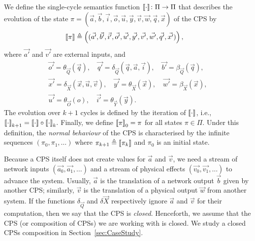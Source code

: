 {\begin{definition}
We define the single-cycle semantics function ${{{\llbracket\cdot\rrbracket}}}\colon \Pi \rightarrow \Pi$ that describes the evolution of the state $\pi=(\vec{a},\vec{b},\vec{i},\vec{o},\vec{u},\vec{y},\vec{v},\vec{w},\vec{q},\vec{x})$ of the CPS by
\begin{align}
{{\llbracket\pi\rrbracket}}&\triangleq\left((\vec{a'},\vec{b'},\vec{i'},\vec{o'},\vec{u'},\vec{y'},\vec{v'},\vec{w'},\vec{q'},\vec{x'})\right), 
\end{align}
where $\vec{a'}$ and $\vec{v'}$ are external inputs, and 
\begin{gather*}
\vec{o'}=\theta_{\vec{Q}}(\vec{q}),\quad 
\vec{q'}=\delta_{\vec{Q}}(\vec{q},\vec{a},\vec{i}),\quad 
\vec{b'}=\beta_{\vec{Q}}(\vec{q}),\\
\vec{x'}=\delta_{\vec{X}}(\vec{x},\vec{u},\vec{v}),\quad
\vec{y'}=\theta_{\vec{X}}(\vec{x}),\quad 
\vec{w'}=\beta_{\vec{X}}(\vec{x}),\\
\vec{u'}= \theta_{\vec{O}}(o),\quad\vec{i'}=\theta_{\vec{Y}}(\vec{y}).
\end{gather*}
The evolution over $k+1$ cycles is defined by the iteration of ${{{\llbracket\cdot\rrbracket}}}$, {i.e.}, 
${{{\llbracket\cdot\rrbracket}}}_{k+1}= {{{\llbracket\cdot\rrbracket}}} \circ {{{\llbracket\cdot\rrbracket}}}_{k}.$
Finally, we define ${{\llbracket\pi\rrbracket}}_{0}=\pi$ for all states $\pi \in \Pi$. Under this definition, the \emph{normal behaviour} of the CPS is characterised by the infinite sequences $(\pi_0, \pi_1, \ldots)$ where $\pi_{k+1}\triangleq{{\llbracket\pi_k\rrbracket}}$ and $\pi_0$ is an initial state.%
\end{definition}
}
Because a CPS itself does not create values for $\vec{a}$ and $\vec{v}$, we need a stream of network inputs $(\vec{a_0}, \vec{a_1}, \ldots)$ and a stream of physical effects $(\vec{v_0}, \vec{v_1}, \ldots)$ to advance the system. Usually, $\vec{a}$ is the translation of a network output $\vec{b}$ given by another CPS; similarly, $\vec{v}$ is the translation of a physical output $\vec{w}$ from another system. If the functions $\delta_{\vec{Q}}$ and $\delta{\vec{X}}$ respectively ignore $\vec{a}$ and $\vec{v}$ for their computation, then we say that the CPS is \emph{closed}.
Henceforth, we assume that the CPS (or composition of CPSs) we are working with is closed. We study a closed CPSs composition in Section~\ref{sec:CaseStudy}.

